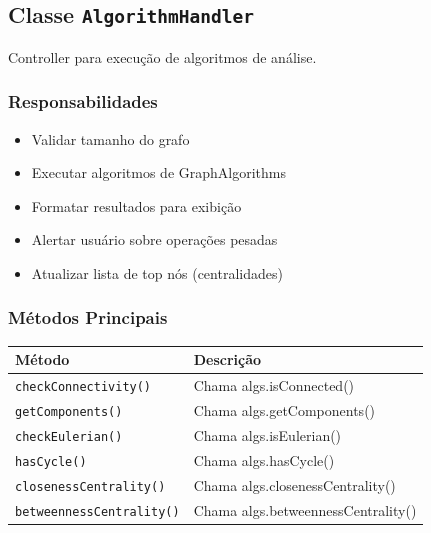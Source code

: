 \documentclass[12pt,a4paper]{article}
\begin{document}
    \subsection{Classe \texttt{AlgorithmHandler}}

    Controller para execução de algoritmos de análise.

    \subsubsection{Responsabilidades}

    \begin{itemize}
        \item Validar tamanho do grafo
        \item Executar algoritmos de GraphAlgorithms
        \item Formatar resultados para exibição
        \item Alertar usuário sobre operações pesadas
        \item Atualizar lista de top nós (centralidades)
    \end{itemize}

    \subsubsection{Métodos Principais}

    \begin{table}[h]
        \centering
        \begin{tabular}{|l|l|}
            \hline
            \textbf{Método} & \textbf{Descrição} \\
            \hline
            \texttt{checkConnectivity()} & Chama algs.isConnected() \\
            \hline
            \texttt{getComponents()} & Chama algs.getComponents() \\
            \hline
            \texttt{checkEulerian()} & Chama algs.isEulerian() \\
            \hline
            \texttt{hasCycle()} & Chama algs.hasCycle() \\
            \hline
            \texttt{closenessCentrality()} & Chama algs.closenessCentrality() \\
            \hline
            \texttt{betweennessCentrality()} & Chama algs.betweennessCentrality() \\
            \hline
        \end{tabular}
    \end{table}
\end{document}

